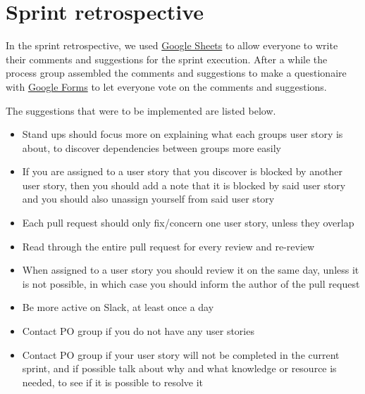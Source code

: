 \section{Sprint retrospective}
In the sprint retrospective, we used \href{https://www.google.com/sheets/about/}{Google Sheets} to allow everyone to write their comments and suggestions for the sprint execution.
After a while the process group assembled the comments and suggestions to make a questionaire with \href{https://www.google.com/forms/about/}{Google Forms} to let everyone vote on the comments and suggestions.

The suggestions that were to be implemented are listed below.

\begin{itemize}
  \item Stand ups should focus more on explaining what each groups user story is about, to discover dependencies between groups more easily
  \item If you are assigned to a user story that you discover is blocked by another user story, then you should add a note that it is blocked by said user story and you should also unassign yourself from said user story
  \item Each pull request should only fix/concern one user story, unless they overlap
  \item Read through the entire pull request for every review and re-review
  \item When assigned to a user story you should review it on the same day, unless it is not possible, in which case you should inform the author of the pull request
  \item Be more active on Slack, at least once a day
  \item Contact PO group if you do not have any user stories
  \item Contact PO group if your user story will not be completed in the current sprint, and if possible talk about why and what knowledge or resource is needed, to see if it is possible to resolve it
\end{itemize}


